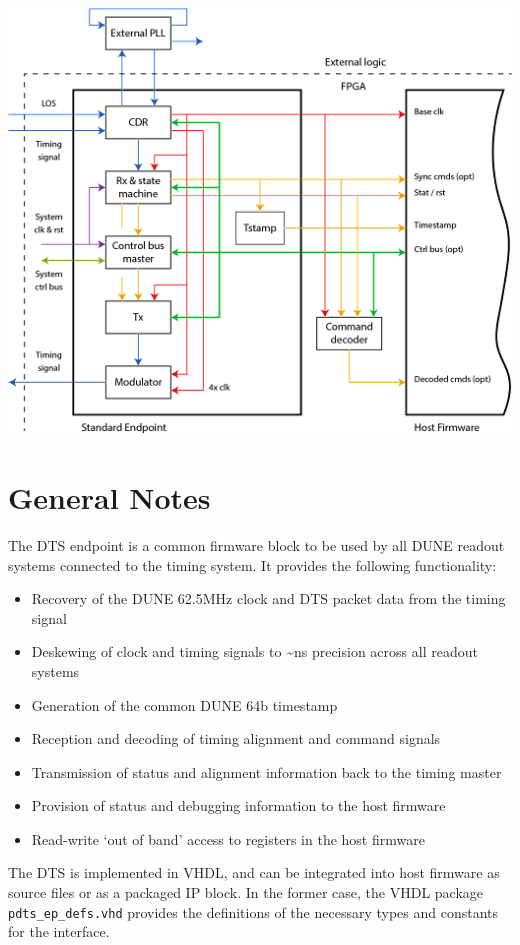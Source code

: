 \documentclass{article}
\begin{document}
\includegraphics[width=1\textwidth]{dts_endpoint_block_diagram.png}


\section{General Notes}

The DTS endpoint is a common firmware block to be used by all DUNE readout systems connected to the timing system. It provides the following functionality:
\begin{itemize}
\item Recovery of the DUNE 62.5MHz clock and DTS packet data from the timing signal
\item Deskewing of clock and timing signals to \textasciitilde{}ns precision across all readout systems
\item Generation of the common DUNE 64b timestamp
\item Reception and decoding of timing alignment and command signals
\item Transmission of status and alignment information back to the timing master
\item Provision of status and debugging information to the host firmware
\item Read-write ‘out of band’ access to registers in the host firmware
\end{itemize}
The DTS is implemented in VHDL, and can be integrated into host firmware as source files or as a packaged IP block. In the former case, the VHDL package \texttt{pdts\_ep\_defs.vhd} provides the definitions of the necessary types and constants for the interface.
\end{document}
